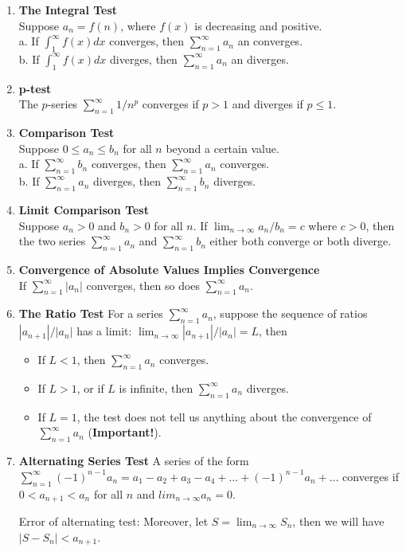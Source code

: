 \documentclass[12pt]{article}
\theoremstyle{definition}
\theoremstyle{definition}
\theoremstyle{remark}
\theoremstyle{definition}
\theoremstyle{definition}
\theoremstyle{definition}
\begin{document}
\begin{enumerate}
\item \textbf{The Integral Test}\\
Suppose $a_n = f(n)$, where $f(x)$ is decreasing and positive.
\\a. If $\int_1^\infty f(x) dx$ converges, then $\sum_{n=1}^{\infty} a_n$ an converges.
\\b. If $\int_1^\infty f(x) dx$ diverges, then $\sum_{n=1}^{\infty} a_n$ an diverges.

\item \textbf{p-test}\\
The $p$-series $\sum_{n=1}^{\infty} 1/n^p$ converges if $p > 1$ and diverges if $p \leq 1$.

\item \textbf{Comparison Test}\\
Suppose $0 \leq a_n \leq b_n$ for all $n$ beyond a certain value.
\\ a. If $\sum_{n=1}^{\infty} b_n$ converges, then $\sum_{n=1}^{\infty} a_n$ converges.
\\ b. If $\sum_{n=1}^{\infty} a_n$ diverges, then $\sum_{n=1}^{\infty} b_n$ diverges.

\item \textbf{Limit Comparison Test}\\
Suppose $a_n > 0$ and $b_n > 0$ for all $n$. If
$\lim_{n\to \infty}a_n/b_n= c$ where $c > 0$,
then the two series $\sum_{n=1}^{\infty} a_n$ and $\sum_{n=1}^{\infty} b_n$ either both converge or both diverge.

\item \textbf{Convergence of Absolute Values Implies Convergence}\\
If $\sum_{n=1}^{\infty}|a_n|$ converges, then so does $\sum_{n=1}^{\infty} a_n$.

\item \textbf{The Ratio Test}
For a series $\sum_{n=1}^{\infty} a_n$, suppose the sequence of ratios $|a_{n+1}|/|a_n|$ has a limit:
$\lim_{n\to \infty}|a_{n+1}|/|a_n| = L$, then
\begin{itemize}
\item If $L < 1$, then $\sum_{n=1}^{\infty} a_n$ converges.
\item If $L > 1$, or if $L$ is infinite, then $\sum_{n=1}^{\infty} a_n$ diverges.
\item If $L = 1$, the test does not tell us anything about the convergence of $\sum_{n=1}^{\infty} a_n$ (\textbf{Important!}).
\end{itemize}

\item \textbf{Alternating Series Test}
A series of the form $\sum_{n=1}^{\infty} (-1)^{n-1}a_n = a_1 - a_2 + a_3 - a_4 + \ldots + (-1)^{n-1}a_n + \ldots$
converges if
$0 < a_{n+1} < a_n$ for all $n$ and $lim_{n \to \infty}a_n = 0$.

Error of alternating test: Moreover,  let $S = \lim_{n\to \infty}S_n$, then we will have $|S - S_n| < a_{n+1}$.
\end{enumerate}
\end{document}
